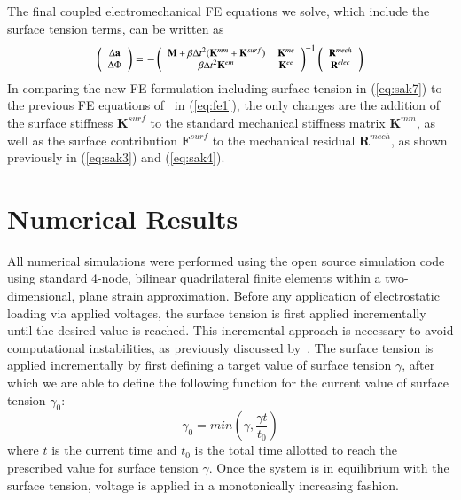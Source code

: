 \documentclass[final,authoryear,3p,times]{elsarticle}
\newcommand{\mbf}{\mathbf}
\begin{document}
The final coupled electromechanical FE equations we solve, which include the surface tension terms, can be written as
\begin{equation}\label{eq:sak7}\footnotesize{ \left(\begin{array}{cc}{\Delta\mbf{a}} \\ {\Delta\Phi}\end{array}\right)=-\left(\begin{array}{cc} {\mbf{M}+\beta\Delta t^{2}(\mbf{K}^{mm}+\mbf{K}^{surf})} & {\mbf{K}^{me}} \\ {\beta\Delta t^{2}\mbf{K}^{em}} & {\mbf{K}^{ee}} \end{array}\right)^{-1}\left(\begin{array}{cc}{\mbf{R}^{mech}} \\ {\mbf{R}^{elec}}\end{array}\right)}
\end{equation}
In comparing the new FE formulation including surface tension in (\ref{eq:sak7}) to the previous FE equations of~\citet{parkIJSS2012} in (\ref{eq:fe1}), the only changes are the addition of the surface stiffness $\mbf{K}^{surf}$ to the standard mechanical stiffness matrix $\mbf{K}^{mm}$, as well as the surface contribution $\mbf{F}^{surf}$ to the mechanical residual $\mbf{R}^{mech}$, as shown previously in (\ref{eq:sak3}) and (\ref{eq:sak4}).


\section{Numerical Results}


All numerical simulations were performed using the open source simulation code~\citet{tahoe} using standard 4-node, bilinear quadrilateral finite elements within a two-dimensional, plane strain approximation.  Before any application of electrostatic loading via applied voltages, the surface tension is first applied incrementally until the desired value is reached.  This incremental approach is necessary to avoid computational instabilities, as previously discussed by~\citet{javiliCMAME2010}.  The surface tension is applied incrementally by first defining a target value of surface tension $\gamma$, after which we are able to define the following function for the current value of surface tension $\gamma_{0}$: 
\begin{equation} \gamma_{0}=min\left(\gamma,\frac{\gamma t}{t_0}\right)
\label{eq:gammaramp}
\end{equation}
where $t$ is the current time and $t_0$ is the total time allotted to reach the prescribed value for surface tension $\gamma$.  Once the system is in equilibrium with the surface tension, voltage is applied in a monotonically increasing fashion.
\end{document}
